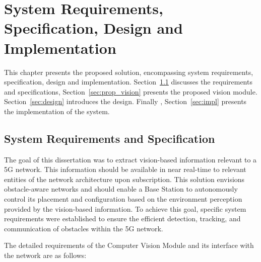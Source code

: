 \chapter{System Requirements, Specification, Design and Implementation}\label{ch:specs_design_implem}

This chapter presents the proposed solution, encompassing system requirements, specification, design and implementation.
Section~\ref{sec:specs} discusses the requirements and specifications, Section~\ref{sec:prop_vision} presents the proposed vision module.
Section~\ref{sec:design} introduces the design.
Finally , Section~\ref{sec:impl} presents the implementation of the system.

\section{System Requirements and Specification}\label{sec:specs}
The goal of this dissertation was to extract vision-based information relevant to a 5G network.
This information should be available in near real-time to relevant entities of the network architecture upon subscription.
This solution envisions obstacle-aware networks and should enable a Base Station to autonomously control its placement and configuration based on the environment perception provided by the vision-based information.
To achieve this goal, specific system requirements were established to ensure the efficient detection, tracking, and communication of obstacles within the 5G network.

The detailed requirements of the Computer Vision Module and its interface with the network are as follows:


